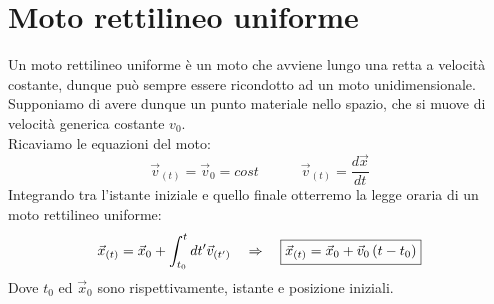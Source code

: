 \section{Moto rettilineo uniforme}
Un moto rettilineo uniforme è un moto che avviene lungo una retta
a velocità costante,
dunque può sempre essere ricondotto ad un moto unidimensionale.\\
Supponiamo di avere dunque un punto materiale nello spazio,
che si muove di velocità generica costante $v_0$.\\
Ricaviamo le equazioni del moto:
\begin{equation}
    \vec v_{(t)} = \vec v_0 = cost\quad\quad\quad
    \vec v_{(t)} = \frac{d\vec x}{dt}
\label{eq:velocity}
\end{equation}
Integrando tra l'istante iniziale e quello finale otterremo la
legge oraria di un moto rettilineo uniforme:
\begin{equation}
    \vec x_{(t)} = \vec x_0 + \int_{t_0}^{t}dt' \vec v_{(t')}\quad\Rightarrow\quad
    \boxed{\vec x_{(t)} = \vec x_0 +\vec v_0\left( t - t_0\right)}
\label{eq:MRU}
\end{equation}
Dove $t_0$ ed $\vec x_0$ sono rispettivamente, istante e
posizione iniziali.